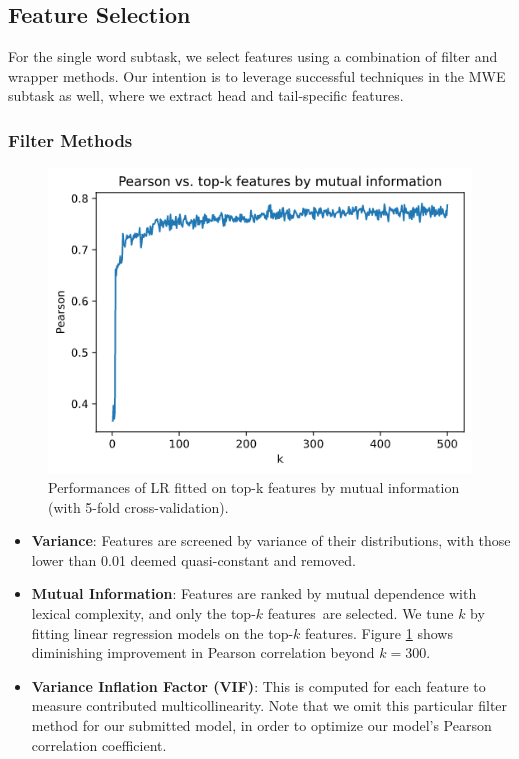 \documentclass{dcthesis}
\theoremstyle{definition}
\theoremstyle{remark}
\begin{document}
\subsection{Feature Selection}

For the single word subtask, we select features using a combination of filter and wrapper methods. Our intention is to leverage successful techniques in the MWE subtask as well, where we extract head and tail-specific features.

\subsubsection{Filter Methods}

\begin{figure}
  \centering
  \includegraphics[scale=0.4]{mi.png}
  \caption{\label{fig:mi} Performances of LR fitted on top-k features by mutual information (with 5-fold cross-validation).}
\end{figure}

\begin{itemize}
  \item \textbf{Variance}: Features are screened by variance of their distributions, with those lower than 0.01 deemed quasi-constant and removed.
  \item \textbf{Mutual Information}: Features are ranked by mutual dependence with lexical complexity, and only the top-$k$ features are selected. We tune $k$ by fitting linear regression models on the top-$k$ features. Figure \ref{fig:mi} shows diminishing improvement in Pearson correlation beyond $k=300$.
  \item \textbf{Variance Inflation Factor (VIF)}: This is computed for each feature to measure contributed multicollinearity. Note that we omit this particular filter method for our submitted model, in order to optimize our model's Pearson correlation coefficient.
\end{itemize}
\end{document}
